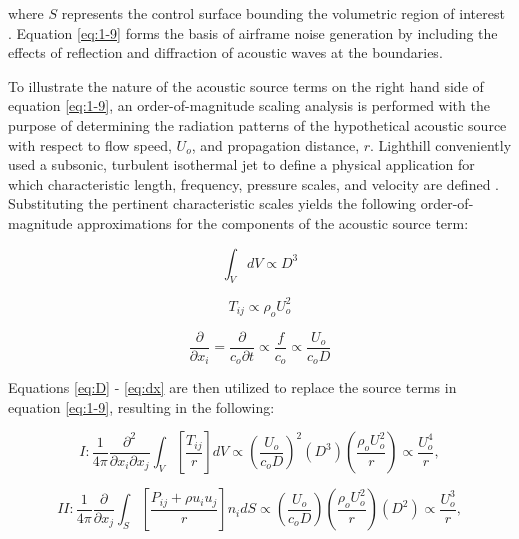 where $S$ represents the control surface bounding the volumetric region of interest \cite{hirschberg2004}. Equation \ref{eq:1-9} forms the basis of airframe noise generation by including the effects of reflection and diffraction of acoustic waves at the boundaries.

To illustrate the nature of the acoustic source terms on the right hand side of equation \ref{eq:1-9}, an order-of-magnitude scaling analysis is performed with the purpose of determining the radiation patterns of the hypothetical acoustic source with respect to flow speed, $U_o$, and propagation distance, $r$. Lighthill conveniently used a subsonic, turbulent isothermal jet to define a physical application for which characteristic length, frequency, pressure scales, and velocity are defined \cite{lighthill1954}. Substituting the pertinent characteristic scales yields the following order-of-magnitude approximations for the components of the acoustic source term:

\begin{equation} \label{eq:D}
\int_{V} dV \propto D^3
\end{equation}

\begin{equation} \label{eq:U}
T_{ij} \propto \rho_o U_o^2
\end{equation}

\begin{equation} \label{eq:dx}
\frac{\partial}{\partial x_i} = \frac{\partial}{c_o \partial t} \propto \frac{f}{c_o} \propto \frac{U_o}{c_o D}
\end{equation}

Equations \ref{eq:D} - \ref{eq:dx} are then utilized to replace the source terms in equation \ref{eq:1-9}, resulting in the following:

\begin{equation}
I : \frac{1}{4\pi} \frac{\partial^2}{\partial x_i \partial x_j} \int_V \left[ \frac{T_{ij}}{r} \right] dV \propto \left( \frac{U_o}{c_o D} \right)^2 \left( D^3 \right) \left( \frac{\rho_o U_o^2}{r} \right) \propto \frac{U_o^4}{r},
\end{equation}

\begin{equation}
II : \frac{1}{4\pi} \frac{\partial}{\partial x_j} \int_S \left[ \frac{P_{ij} + \rho u_i u_j}{r} \right] n_i dS \propto \left( \frac{U_o}{c_oD} \right) \left( \frac{\rho_o U_o^2}{r} \right) \left( D^2 \right) \propto \frac{U_o^3}{r},
\end{equation}

